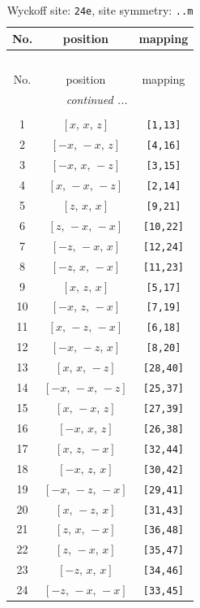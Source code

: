 \documentclass[fleqn,8pt]{jsarticle}
\begin{document}
\renewcommand{\arraystretch}{1.2}
\begin{longtable}{ccc}
\caption{Wyckoff site: {\tt 24e}, site symmetry: {\tt ..m}}
 \\
 \hline \hline
No. & position & mapping \\ \hline \endfirsthead

\multicolumn{2}{l}{\tablename\ \thetable{}} \\
 \hline \hline
No. & position & mapping \\ \hline \endhead

 \hline \hline
\multicolumn{2}{r}{\footnotesize\it continued ...} \\ \endfoot

 \hline \hline
\multicolumn{2}{r}{} \\ \endlastfoot

1 & $\left[ x,\, x,\, z \right]$ & {\tt [1,13]} \\ \hline
2 & $\left[ - x,\, - x,\, z \right]$ & {\tt [4,16]} \\ \hline
3 & $\left[ - x,\, x,\, - z \right]$ & {\tt [3,15]} \\ \hline
4 & $\left[ x,\, - x,\, - z \right]$ & {\tt [2,14]} \\ \hline
5 & $\left[ z,\, x,\, x \right]$ & {\tt [9,21]} \\ \hline
6 & $\left[ z,\, - x,\, - x \right]$ & {\tt [10,22]} \\ \hline
7 & $\left[ - z,\, - x,\, x \right]$ & {\tt [12,24]} \\ \hline
8 & $\left[ - z,\, x,\, - x \right]$ & {\tt [11,23]} \\ \hline
9 & $\left[ x,\, z,\, x \right]$ & {\tt [5,17]} \\ \hline
10 & $\left[ - x,\, z,\, - x \right]$ & {\tt [7,19]} \\ \hline
11 & $\left[ x,\, - z,\, - x \right]$ & {\tt [6,18]} \\ \hline
12 & $\left[ - x,\, - z,\, x \right]$ & {\tt [8,20]} \\ \hline
13 & $\left[ x,\, x,\, - z \right]$ & {\tt [28,40]} \\ \hline
14 & $\left[ - x,\, - x,\, - z \right]$ & {\tt [25,37]} \\ \hline
15 & $\left[ x,\, - x,\, z \right]$ & {\tt [27,39]} \\ \hline
16 & $\left[ - x,\, x,\, z \right]$ & {\tt [26,38]} \\ \hline
17 & $\left[ x,\, z,\, - x \right]$ & {\tt [32,44]} \\ \hline
18 & $\left[ - x,\, z,\, x \right]$ & {\tt [30,42]} \\ \hline
19 & $\left[ - x,\, - z,\, - x \right]$ & {\tt [29,41]} \\ \hline
20 & $\left[ x,\, - z,\, x \right]$ & {\tt [31,43]} \\ \hline
21 & $\left[ z,\, x,\, - x \right]$ & {\tt [36,48]} \\ \hline
22 & $\left[ z,\, - x,\, x \right]$ & {\tt [35,47]} \\ \hline
23 & $\left[ - z,\, x,\, x \right]$ & {\tt [34,46]} \\ \hline
24 & $\left[ - z,\, - x,\, - x \right]$ & {\tt [33,45]} \\
\end{longtable}
\end{document}
